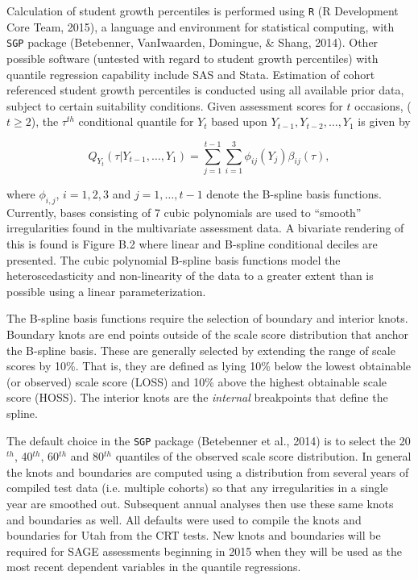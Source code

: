 \documentclass[12pt]{article}
\begin{document}
Calculation of student growth percentiles is performed using \texttt{R}
(R Development Core Team, 2015), a language and environment for
statistical computing, with \texttt{SGP} package (Betebenner,
{VanIwaarden}, Domingue, \& Shang, 2014). Other possible software
(untested with regard to student growth percentiles) with quantile
regression capability include SAS and Stata. Estimation of cohort
referenced student growth percentiles is conducted using all available
prior data, subject to certain suitability conditions. Given assessment
scores for \(t\) occasions, (\(t \geq 2\)), the \(\tau\)\(^{th}\)
conditional quantile for \(Y_ t\) based upon
\(Y_ {t-1}, Y_ {t-2}, \ldots, Y_1\) is given by

\begin{equation} Q_ {Y_ t} (\tau | Y_ {t-1}, \ldots, Y_ 1) = \sum_ {j=1}^{t-1} \sum_ {i=1}^3 \phi_ {ij}(Y_ j)\beta_ {ij}(\tau),\end{equation}

where \(\phi_ {i,j}\), \(i=1,2,3\) and \(j=1, \ldots, t-1\) denote the
B-spline basis functions. Currently, bases consisting of 7 cubic
polynomials are used to ``smooth'' irregularities found in the
multivariate assessment data. A bivariate rendering of this is found is
Figure B.2 where linear and B-spline conditional deciles are presented.
The cubic polynomial B-spline basis functions model the
heteroscedasticity and non-linearity of the data to a greater extent
than is possible using a linear parameterization.

The B-spline basis functions require the selection of boundary and
interior knots. Boundary knots are end points outside of the scale score
distribution that anchor the B-spline basis. These are generally
selected by extending the range of scale scores by 10\%. That is, they
are defined as lying 10\% below the lowest obtainable (or observed)
scale score (LOSS) and 10\% above the highest obtainable scale score
(HOSS). The interior knots are the \emph{internal} breakpoints that
define the spline.

The default choice in the \texttt{SGP} package (Betebenner et al., 2014)
is to select the 20\(^{th}\), 40\(^{th}\), 60\(^{th}\) and 80\(^{th}\)
quantiles of the observed scale score distribution. In general the knots
and boundaries are computed using a distribution from several years of
compiled test data (i.e. multiple cohorts) so that any irregularities in
a single year are smoothed out. Subsequent annual analyses then use
these same knots and boundaries as well. All defaults were used to
compile the knots and boundaries for Utah from the CRT tests. New knots
and boundaries will be required for SAGE assessments beginning in 2015
when they will be used as the most recent dependent variables in the
quantile regressions.
\end{document}
